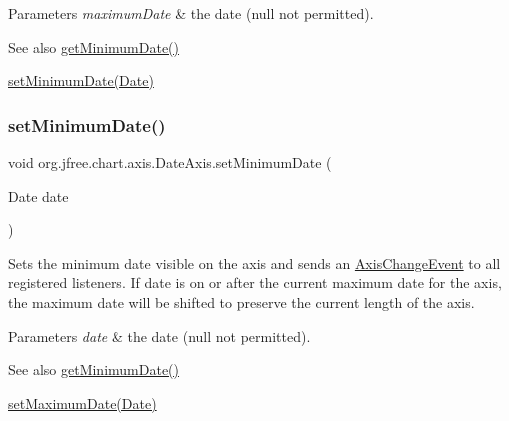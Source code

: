 \begin{DoxyParams}{Parameters}
{\em maximum\+Date} & the date ({\ttfamily null} not permitted).\\
\hline
\end{DoxyParams}
\begin{DoxySeeAlso}{See also}
\mbox{\hyperlink{classorg_1_1jfree_1_1chart_1_1axis_1_1_date_axis_a7749424d09b9dc565b489112aa186672}{get\+Minimum\+Date()}} 

\mbox{\hyperlink{classorg_1_1jfree_1_1chart_1_1axis_1_1_date_axis_aef8462c6877d21ffdbc2ae4fa0073469}{set\+Minimum\+Date(\+Date)}} 
\end{DoxySeeAlso}
\mbox{\label{classorg_1_1jfree_1_1chart_1_1axis_1_1_date_axis_aef8462c6877d21ffdbc2ae4fa0073469}} 
\subsubsection{\texorpdfstring{set\+Minimum\+Date()}{setMinimumDate()}}
{\footnotesize\ttfamily void org.\+jfree.\+chart.\+axis.\+Date\+Axis.\+set\+Minimum\+Date (\begin{DoxyParamCaption}\item[{Date}]{date }\end{DoxyParamCaption})}

Sets the minimum date visible on the axis and sends an \mbox{\hyperlink{}{Axis\+Change\+Event}} to all registered listeners. If {\ttfamily date} is on or after the current maximum date for the axis, the maximum date will be shifted to preserve the current length of the axis.


\begin{DoxyParams}{Parameters}
{\em date} & the date ({\ttfamily null} not permitted).\\
\hline
\end{DoxyParams}
\begin{DoxySeeAlso}{See also}
\mbox{\hyperlink{classorg_1_1jfree_1_1chart_1_1axis_1_1_date_axis_a7749424d09b9dc565b489112aa186672}{get\+Minimum\+Date()}} 

\mbox{\hyperlink{classorg_1_1jfree_1_1chart_1_1axis_1_1_date_axis_a39b7d4f271f0e436b2ddc59d942d493d}{set\+Maximum\+Date(\+Date)}} 
\end{DoxySeeAlso}
\mbox{\label{classorg_1_1jfree_1_1chart_1_1axis_1_1_date_axis_a8dc808d1cbbae4cf0b97dc316a963859}} 
